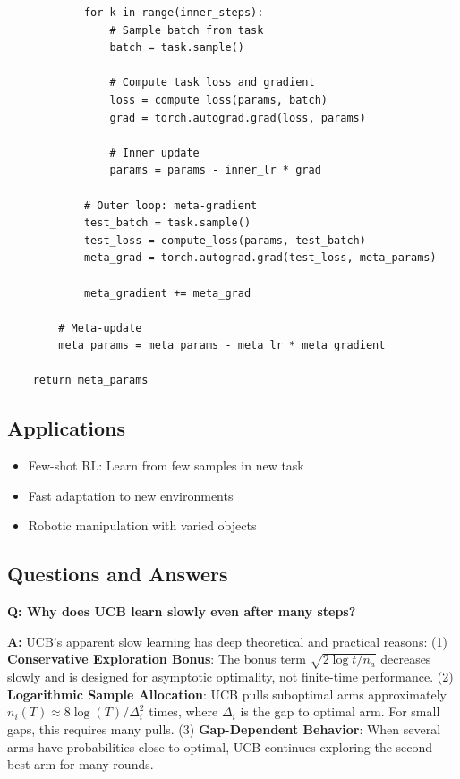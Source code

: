 \documentclass[12pt]{article}
\begin{document}
{{{\begin{verbatim}
            for k in range(inner_steps):
                # Sample batch from task
                batch = task.sample()
                
                # Compute task loss and gradient
                loss = compute_loss(params, batch)
                grad = torch.autograd.grad(loss, params)
                
                # Inner update
                params = params - inner_lr * grad
            
            # Outer loop: meta-gradient
            test_batch = task.sample()
            test_loss = compute_loss(params, test_batch)
            meta_grad = torch.autograd.grad(test_loss, meta_params)
            
            meta_gradient += meta_grad
        
        # Meta-update
        meta_params = meta_params - meta_lr * meta_gradient
    
    return meta_params
\end{verbatim}

\subsection{Applications}

\begin{itemize}
\item Few-shot RL: Learn from few samples in new task
\item Fast adaptation to new environments
\item Robotic manipulation with varied objects
\end{itemize}

\subsection{Questions and Answers}

\textbf{Q: Why does UCB learn slowly even after many steps?}

\textbf{A:} UCB's apparent slow learning has deep theoretical and practical reasons: (1) \textbf{Conservative Exploration Bonus}: The bonus term $\sqrt{2 \log t / n_a}$ decreases slowly and is designed for asymptotic optimality, not finite-time performance. (2) \textbf{Logarithmic Sample Allocation}: UCB pulls suboptimal arms approximately $n_i(T) \approx 8 \log(T) / \Delta_i^2$ times, where $\Delta_i$ is the gap to optimal arm. For small gaps, this requires many pulls. (3) \textbf{Gap-Dependent Behavior}: When several arms have probabilities close to optimal, UCB continues exploring the second-best arm for many rounds.

}}}
\end{document}
